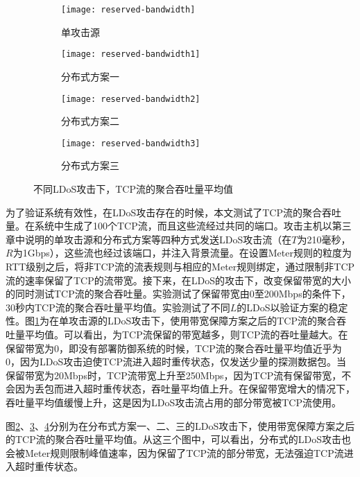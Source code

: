 \begin{figure}
    \begin{subfigure}{.49\textwidth}
        \centering
        \texttt{[image: reserved-bandwidth]}
        \caption{单攻击源}
        \label{fig:reserved-bandwidth-single}
    \end{subfigure}
    \begin{subfigure}{.49\textwidth}
        \centering
        \texttt{[image: reserved-bandwidth1]}
        \caption{分布式方案一}
        \label{fig:reserved-bandwidth-2h-mod1}
    \end{subfigure}

    \begin{subfigure}{.49\textwidth}
        \centering
        \texttt{[image: reserved-bandwidth2]}
        \caption{分布式方案二}
        \label{fig:reserved-bandwidth-2h-mod2}
    \end{subfigure}
    \begin{subfigure}{.49\textwidth}
        \centering
        \texttt{[image: reserved-bandwidth3]}
        \caption{分布式方案三}
        \label{fig:reserved-bandwidth-2h-mod3}
    \end{subfigure}


    \caption{不同LDoS攻击下，TCP流的聚合吞吐量平均值}
    \label{fig:reserved-bandwidth-all}
\end{figure}
为了验证系统有效性，在LDoS攻击存在的时候，本文测试了TCP流的聚合吞吐量。在系统中生成了100个TCP流，而且这些流经过共同的端口。攻击主机以第三章中说明的单攻击源和分布式方案等四种方式发送LDoS攻击流（在$T$为210毫秒，$R$为1Gbps），这些流也经过该端口，并注入背景流量。在设置Meter规则的粒度为RTT级别之后，将非TCP流的流表规则与相应的Meter规则绑定，通过限制非TCP流的速率保留了TCP的流带宽。接下来，在LDoS的攻击下，改变保留带宽的大小的同时测试TCP流的聚合吞吐量。实验测试了保留带宽由0至200Mbps的条件下，30秒内TCP流的聚合吞吐量平均值。实验测试了不同$L$的LDoS以验证方案的稳定性。图\ref{fig:reserved-bandwidth-single}为在单攻击源的LDoS攻击下，使用带宽保障方案之后的TCP流的聚合吞吐量平均值。可以看出，为TCP流保留的带宽越多，则TCP流的吞吐量越大。在保留带宽为0，即没有部署防御系统的时候，TCP流的聚合吞吐量平均值近乎为0，因为LDoS攻击迫使TCP流进入超时重传状态，仅发送少量的探测数据包。当保留带宽为20Mbps时，TCP流带宽上升至250Mbps，因为TCP流有保留带宽，不会因为丢包而进入超时重传状态，吞吐量平均值上升。在保留带宽增大的情况下，吞吐量平均值缓慢上升，这是因为LDoS攻击流占用的部分带宽被TCP流使用。

图\ref{fig:reserved-bandwidth-2h-mod1}、\ref{fig:reserved-bandwidth-2h-mod2}、\ref{fig:reserved-bandwidth-2h-mod3}分别为在分布式方案一、二、三的LDoS攻击下，使用带宽保障方案之后的TCP流的聚合吞吐量平均值。从这三个图中，可以看出，分布式的LDoS攻击也会被Meter规则限制峰值速率，因为保留了TCP流的部分带宽，无法强迫TCP流进入超时重传状态。



